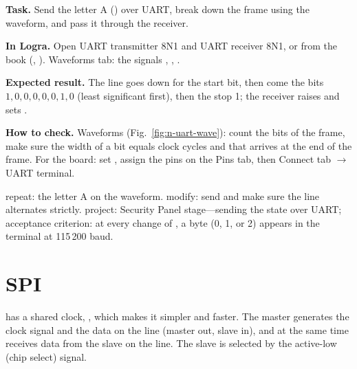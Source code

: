 \begin{diybox}
\textbf{Task.} Send the letter A () over UART, break down the frame using the waveform, and pass it through the receiver.

\textbf{In Logra.} Open UART transmitter 8N1 and UART receiver 8N1, or  from the book (, ). Waveforms tab: the signals , , .

\textbf{Expected result.} The line goes down for the start bit, then come the bits $1,0,0,0,0,0,1,0$ (least significant first), then the stop 1; the receiver raises  and sets .

\textbf{How to check.} Waveforms (Fig.~\ref{fig:n-uart-wave}): count the bits of the frame, make sure the width of a bit equals  clock cycles and that  arrives at the end of the frame. For the board: set , assign the pins on the Pins tab, then Connect tab $\to$ UART terminal.

 repeat: the letter A on the waveform.  modify: send  and make sure the line alternates strictly.  project: Security Panel stage---sending the state over UART; acceptance criterion: at every change of , a byte (0, 1, or 2) appears in the terminal at 115\,200 baud.
\end{diybox}

\section{SPI}

 has a shared clock, , which makes it simpler and faster.
The master generates the clock signal and the data on the  line
(master out, slave in), and at the same time receives data from the slave on
the  line. The slave is selected by the active-low  (chip
select) signal.

